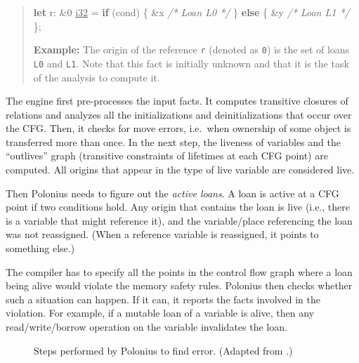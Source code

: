 \documentclass[
  11pt,
  twoside,symmetric]{report}
\newenvironment{Shaded}{}{}
\newcommand{\CharTok}[1]{#1}
\newcommand{\CommentTok}[1]{\textit{#1}}
\newcommand{\ControlFlowTok}[1]{\textbf{#1}}
\newcommand{\DataTypeTok}[1]{\underline{#1}}
\newcommand{\DecValTok}[1]{#1}
\newcommand{\KeywordTok}[1]{\textbf{#1}}
\newcommand{\NormalTok}[1]{#1}
\newcommand{\OperatorTok}[1]{#1}
\begin{document}
\begin{quote}
\begin{Shaded}
\begin{Highlighting}[]
\KeywordTok{let}\NormalTok{ r}\OperatorTok{:} \OperatorTok{\&}\CharTok{\textquotesingle{}}\DecValTok{0} \DataTypeTok{i32} \OperatorTok{=} \ControlFlowTok{if}\NormalTok{ (cond) }\OperatorTok{\{}
    \OperatorTok{\&}\NormalTok{x }\CommentTok{/* Loan L0 */}
\OperatorTok{\}} \ControlFlowTok{else} \OperatorTok{\{}
    \OperatorTok{\&}\NormalTok{y }\CommentTok{/* Loan L1 */}
\OperatorTok{\};}
\end{Highlighting}
\end{Shaded}

\textbf{Example:} The origin of the reference \texttt{r} (denoted as
\texttt{\textquotesingle{}0}) is the set of loans \texttt{L0} and
\texttt{L1}. Note that this fact is initially unknown and that it is the
task of the analysis to compute it.
\end{quote}

The engine first pre-processes the input facts. It computes transitive
closures of relations and analyzes all the initializations and
deinitializations that occur over the CFG. Then, it checks for move
errors, i.e.~when ownership of some object is transferred more than
once. In the next step, the liveness of variables and the ``outlives''
graph (transitive constraints of lifetimes at each CFG point) are
computed. All origins that appear in
the type of live variable are considered live.

Then Polonius needs to figure out the \emph{active loans}. A loan is
active at a CFG point if two conditions hold. Any origin that contains
the loan is live (i.e., there is a variable that might reference it),
and the variable/place referencing the loan was not reassigned. (When a
reference variable is reassigned, it points to something else.)

The compiler has to specify all the points in the control flow graph
where a loan being alive would violate the memory safety rules. Polonius
then checks whether such a situation can happen. If it can, it reports
the facts involved in the violation. For example, if a mutable loan of a
variable is alive, then any read/write/borrow operation on the variable
invalidates the loan.

\begin{figure}
\centering

\caption{Steps performed by Polonius to find error. (Adapted from
.)}
\end{figure}
\end{document}

